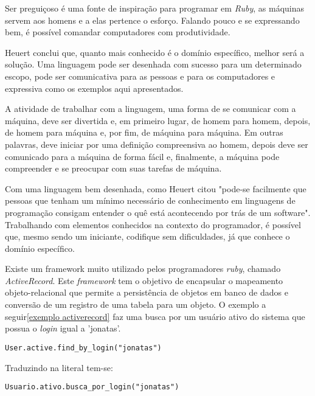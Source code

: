\documentclass[espaco=simples,appendix=Name]{abnt}
\begin{document}
Ser preguiçoso é uma fonte de inspiração para programar em \textit{Ruby}, as máquinas servem aos homens e a elas pertence o esforço. Falando pouco e se expressando bem, é possível comandar computadores com produtividade.

Heuert\cite{dslLeandro} conclui que, quanto mais conhecido é o domínio específico, melhor será a solução. Uma linguagem pode ser desenhada com sucesso para um determinado escopo, pode ser comunicativa para as pessoas e para os computadores e expressiva como os exemplos aqui apresentados.

A atividade de trabalhar com a linguagem, uma forma de se comunicar com a máquina, deve ser divertida e, em primeiro lugar, de homem para homem, depois, de homem para máquina e, por fim, de máquina para máquina\cite{entrevistaDivertidaComMatz}. Em outras palavras, deve iniciar por uma definição compreensiva ao homem, depois deve ser comunicado para a máquina de forma fácil e, finalmente, a máquina pode compreender e se preocupar com suas tarefas de máquina.


Com uma linguagem bem desenhada, como Heuert citou "pode-se facilmente que pessoas que tenham um mínimo necessário de conhecimento em linguagens de programação consigam entender o quê está acontecendo por trás de um software"\cite{dslLeandro}. Trabalhando com elementos conhecidos na contexto do programador, é possível que, mesmo sendo um iniciante, codifique sem dificuldades, já que conhece o domínio específico.

Existe um framework muito utilizado pelos programadores \textit{ruby}, chamado \textit{ActiveRecord}. Este \textit{framework} tem o objetivo de encapsular o mapeamento objeto-relacional que permite a persistência de objetos em banco de dados e conversão de um registro de uma tabela para um objeto. O exemplo a seguir\ref{exemplo activerecord} faz uma busca por um usuário ativo do sistema que possua o \textit{login} igual a 'jonatas'.

\begin{lstlisting}[label=exemplo activerecord, caption=Exemplo de busca com o framework ActiveRecord]
User.active.find_by_login("jonatas")
\end{lstlisting}

Traduzindo na literal tem-se:
\begin{lstlisting}[label=exemplo activerecord traduzido, caption=Exemplo traduzido de busca com o framework ActiveRecord]
Usuario.ativo.busca_por_login("jonatas")
\end{lstlisting}
\end{document}
